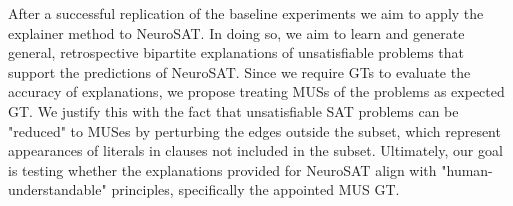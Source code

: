 After a successful replication of the baseline experiments we aim to apply the explainer method to NeuroSAT. In doing so, we aim to learn and generate  general, retrospective bipartite explanations of unsatisfiable problems that support the predictions of NeuroSAT. Since we require \acp{GT} to evaluate the accuracy of explanations, we propose treating \acp{MUS} of the problems as expected \ac{GT}. We justify this with the fact that unsatisfiable SAT problems can be "reduced" to MUSes by perturbing the edges outside the subset, which represent appearances of literals in clauses not included in the subset. Ultimately, our goal is testing whether the explanations provided for NeuroSAT align with "human-understandable" principles, specifically the appointed MUS \ac{GT}.